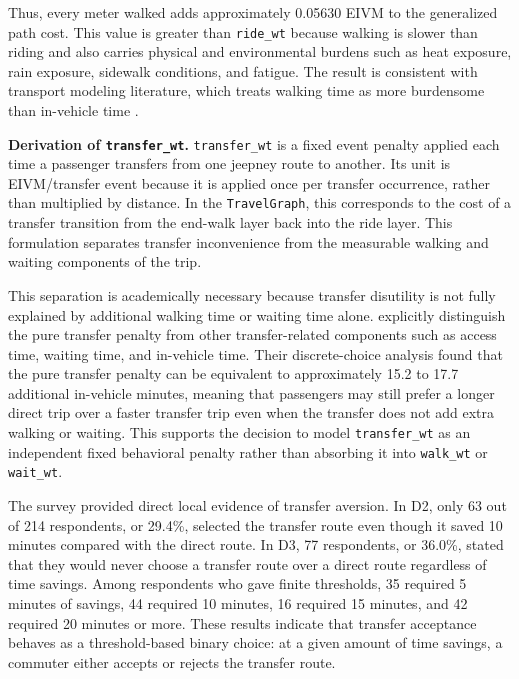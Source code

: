 {Thus, every meter walked adds approximately 0.05630 \ac{EIVM} to the generalized path cost. This value is greater than \texttt{ride\_wt} because walking is slower than riding and also carries physical and environmental burdens such as heat exposure, rain exposure, sidewalk conditions, and fatigue. The result is consistent with transport modeling literature, which treats walking time as more burdensome than in-vehicle time \citep{wardman2004public,ortuzar2011modelling}.

\noindent\textbf{Derivation of \texttt{transfer\_wt}.}
\texttt{transfer\_wt} is a fixed event penalty applied each time a passenger transfers from one jeepney route to another. Its unit is \ac{EIVM}/transfer event because it is applied once per transfer occurrence, rather than multiplied by distance. In the \texttt{TravelGraph}, this corresponds to the cost of a transfer transition from the end-walk layer back into the ride layer. This formulation separates transfer inconvenience from the measurable walking and waiting components of the trip.

This separation is academically necessary because transfer disutility is not fully explained by additional walking time or waiting time alone. \cite{garciamartinez2018transfer} explicitly distinguish the pure transfer penalty from other transfer-related components such as access time, waiting time, and in-vehicle time. Their discrete-choice analysis found that the pure transfer penalty can be equivalent to approximately 15.2 to 17.7 additional in-vehicle minutes, meaning that passengers may still prefer a longer direct trip over a faster transfer trip even when the transfer does not add extra walking or waiting. This supports the decision to model \texttt{transfer\_wt} as an independent fixed behavioral penalty rather than absorbing it into \texttt{walk\_wt} or \texttt{wait\_wt}.

The survey provided direct local evidence of transfer aversion. In D2, only 63 out of 214 respondents, or 29.4\%, selected the transfer route even though it saved 10 minutes compared with the direct route. In D3, 77 respondents, or 36.0\%, stated that they would never choose a transfer route over a direct route regardless of time savings. Among respondents who gave finite thresholds, 35 required 5 minutes of savings, 44 required 10 minutes, 16 required 15 minutes, and 42 required 20 minutes or more. These results indicate that transfer acceptance behaves as a threshold-based binary choice: at a given amount of time savings, a commuter either accepts or rejects the transfer route.

}
